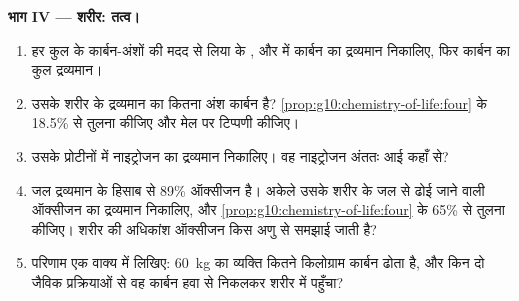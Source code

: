 \begin{problem}[{सप्ताहांत समस्या --- गेहूँ के खेत से एक शरीर तक: पदार्थ
का लेखा-जोखा, दाने के जल से लेकर इस सवाल तक कि कोई व्यक्ति कितने
किलोग्राम कार्बन ढोता है}]
\medskip
\noindent\textbf{भाग IV --- शरीर: तत्व।}
\begin{enumerate}[resume]
  \item हर कुल के कार्बन-अंशों की मदद से लिया के , 
        और  में कार्बन का द्रव्यमान निकालिए, फिर कार्बन का कुल
        द्रव्यमान।
  \item उसके शरीर के द्रव्यमान का कितना अंश कार्बन है?
        \cref{prop:g10:chemistry-of-life:four} के 18.5\% से तुलना
        कीजिए और मेल पर टिप्पणी कीजिए।
  \item उसके प्रोटीनों में नाइट्रोजन का द्रव्यमान निकालिए। वह नाइट्रोजन
        अंततः आई कहाँ से?
  \item जल द्रव्यमान के हिसाब से 89\% ऑक्सीजन है। अकेले उसके शरीर के जल
        से ढोई जाने वाली ऑक्सीजन का द्रव्यमान निकालिए, और
        \cref{prop:g10:chemistry-of-life:four} के 65\% से तुलना कीजिए।
        शरीर की अधिकांश ऑक्सीजन किस अणु से समझाई जाती है?
  \item परिणाम एक वाक्य में लिखिए: \qty{60}{kg} का व्यक्ति कितने
        किलोग्राम कार्बन ढोता है, और किन दो जैविक प्रक्रियाओं से वह
        कार्बन हवा से निकलकर शरीर में पहुँचा?
\end{enumerate}
\end{problem}
